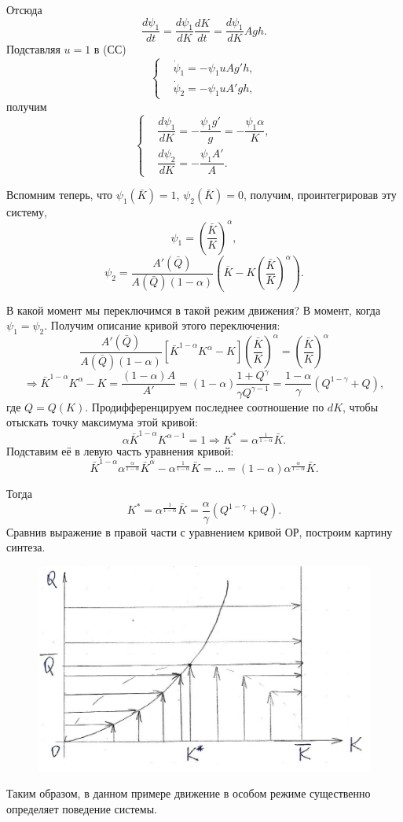 \documentclass[12pt, a4paper]{article}
\theoremstyle{rusdef}
\DeclareMathOperator*{\thus}{\Rightarrow} %
\begin{document}
Отсюда
\[
  \dfrac{d\psi_1}{dt} = \dfrac{d\psi_1}{dK} \dfrac{dK}{dt} = \dfrac{d\psi_1}{dK} Agh.
\]
Подставляя $u = 1$ в (СС)
\[
  \left\{
    \begin{aligned}
      &\dot{\psi}_1 = -\psi_1 uAg'h,\\
      &\dot{\psi}_2 = -\psi_1 uA'gh,
    \end{aligned}
  \right.
\]
получим
\[
  \left\{
    \begin{aligned}
      &\dfrac{d\psi_1}{dK} = - \dfrac{\psi_1 g'}{g} = - \dfrac{\psi_1 \alpha}{K}, \\
      &\dfrac{d\psi_2}{dK} = - \dfrac{\psi_1 A'}{A}.
    \end{aligned}
  \right.
\]

Вспомним теперь, что $\psi_1(\bar{K}) = 1$, $\psi_2(\bar{K}) = 0$, получим, проинтегрировав эту систему,
\[
  \psi_1 = \left(\dfrac{\bar{K}}{K}\right)^\alpha,
\]
\[
  \psi_2 = \dfrac{A'(\bar{Q})}{A(\bar{Q})(1 - \alpha)} \left(\bar{K} - K \left(\dfrac{\bar{K}}{K}\right)^\alpha\right).
\]

В какой момент мы переключимся в такой режим движения? В момент, когда $\psi_1 = \psi_2$. Получим описание кривой этого переключения:
\[
  \dfrac{A'(\bar{Q})}{A(\bar{Q})(1 - \alpha)}[\bar{K}^{1 - \alpha}K^{\alpha} - K]\left(\dfrac{\bar{K}}{K}\right)^\alpha= \left(\dfrac{\bar{K}}{K}\right)^\alpha
\]
\[
  \thus \bar{K}^{1 - \alpha} K^{\alpha} - K = \dfrac{(1 - \alpha)A}{A'} = (1 - \alpha) \dfrac{1 + Q^{\gamma}}{\gamma Q^{\gamma - 1}} = \dfrac{1 - \alpha}{\gamma}(Q^{1 - \gamma} + Q),
\]
где $Q = Q(K)$. Продифференцируем последнее соотношение по $dK$, чтобы отыскать точку максимума этой кривой:
\[
  \alpha \bar{K}^{1 - \alpha} K^{\alpha - 1} = 1 \thus K^* = \alpha^{\frac{1}{1 - \alpha}} \bar{K}.
\]
Подставим её в левую часть уравнения кривой:
\[
  \bar{K}^{1 - \alpha} \alpha^{\frac{\alpha}{1 - \alpha}} \bar{K}^{\alpha} - \alpha^{\frac{1}{1 - \alpha}} \bar{K} = \ldots = (1 - \alpha) \alpha^{\frac{\alpha}{1 - \alpha}} \bar{K}.
\]

Тогда
\[
  K^* = \alpha^{\frac{1}{1 - \alpha}} \bar{K} = \dfrac{\alpha}{\gamma}(Q^{1-\gamma} + Q).
\]
Сравнив выражение в правой части с уравнением кривой ОР, построим картину синтеза.

\begin{figure}[ht]
  \center
  \includegraphics[width=\linewidth]{pic6.png}
\end{figure}

Таким образом, в данном примере движение в особом режиме существенно определяет поведение системы.
\end{document}
